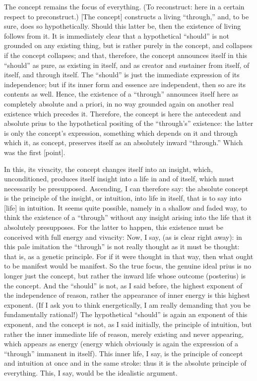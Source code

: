 The concept remains the focus of everything.
(To reconstruct: here in a certain respect to preconstruct.)
[The concept] constructs a living “through,”
and, to be sure, does so hypothetically.
Should this latter be,
then the existence of living follows from it.
It is immediately clear that a hypothetical “should” is
not grounded on any existing thing,
but is rather purely in the concept,
and collapses if the concept collapses;
and that, therefore, the concept announces
itself in this “should” as pure,
as existing in itself,
and as creator and sustainer
from itself, of itself, and through itself.
The “should” is just the immediate
expression of its independence;
but if its inner form and essence are independent,
then so are its contents as well.
Hence, the existence of a “through”
announces itself here as completely absolute and a priori,
in no way grounded again on another real existence which precedes it.
Therefore, the concept is here the antecedent
and absolute prius to the hypothetical positing
of the “through’s” existence:
the latter is only the concept’s expression,
something which depends on it
and through which it, as concept, preserves itself
as an absolutely inward “through.”
Which was the first [point].

In this, its vivacity,
the concept changes itself into an insight,
which, unconditioned, produces itself
insight into a life in and of itself,
which must necessarily be presupposed.
Ascending, I can therefore say:
the absolute concept is the principle of the insight,
or intuition, into life in itself,
that is to say into [life] in intuition.
It seems quite possible, namely in a shallow and faded way,
to think the existence of a “through” without any insight
arising into the life that it absolutely presupposes.
For the latter to happen, this existence must
be conceived with full energy and vivacity:
Now, I say, (as is clear right away):
in this pale imitation the “through” is
not really thought as it must be thought:
that is, as a genetic principle.
For if it were thought in that way,
then what ought to be manifest would be manifest.
So the true focus, the genuine ideal prius is
no longer just the concept,
but rather the inward life
whose outcome (posterius) is the concept.
And the “should” is not, as I said before, the highest
exponent of the independence of reason,
rather the appearance of inner energy is this highest exponent.
(If I ask you to think energetically,
I am really demanding that you be fundamentally rational!)
The hypothetical “should” is again an exponent of this exponent,
and the concept is not, as I said initially,
the principle of intuition,
but rather the inner immediate life of reason,
merely existing and never appearing,
which appears as energy
(energy which obviously is again
the expression of a “through” immanent in itself).
This inner life, I say, is the principle
of concept and intuition at once
and in the same stroke:
thus it is the absolute principle of everything.
This, I say, would be the idealistic argument.

